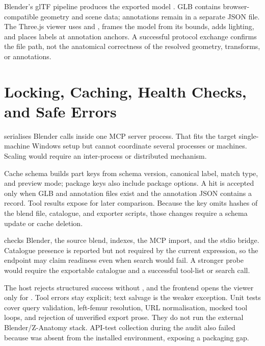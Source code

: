 Blender's glTF pipeline produces the exported model \parencite{blenderGltf}. GLB contains browser-compatible geometry and scene data; annotations remain in a separate JSON file. The Three.js viewer uses  and , frames the model from its bounds, adds lighting, and places labels at annotation anchors. A successful protocol exchange confirms the file path, not the anatomical correctness of the resolved geometry, transforms, or annotations.

\section{Locking, Caching, Health Checks, and Safe Errors}
\label{sec:reliability}

 serialises Blender calls inside one MCP server process. That fits the target single-machine Windows setup but cannot coordinate several processes or machines. Scaling would require an inter-process or distributed mechanism.

Cache schema  builds part keys from schema version, canonical label, match type, and preview mode; package keys also include package options. A hit is accepted only when GLB and annotation files exist and the annotation JSON contains a record. Tool results expose  for later comparison. Because the key omits hashes of the blend file, catalogue, and exporter scripts, those changes require a schema update or cache deletion.

 checks Blender, the source blend, indexes, the MCP import, and the stdio bridge. Catalogue presence is reported but not required by the current  expression, so the endpoint may claim readiness even when search would fail. A stronger probe would require the exportable catalogue and a successful tool-list or search call.

The host rejects structured success without , and the frontend opens the viewer only for . Tool errors stay explicit; text salvage is the weaker exception. Unit tests cover query validation, left-femur resolution, URL normalisation, mocked tool loops, and rejection of unverified export prose. They do not run the external Blender/Z-Anatomy stack. API-test collection during the audit also failed because  was absent from the installed environment, exposing a packaging gap.

